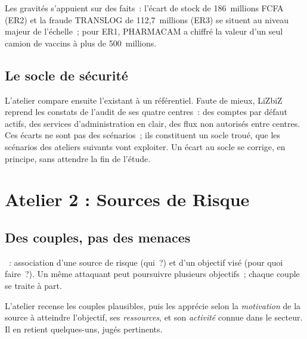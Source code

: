 Les gravités s'appuient sur des faits~: l'écart de stock de 186~millions
FCFA (ER2) et la fraude TRANSLOG de 112,7~millions (ER3) se situent au
niveau majeur de l'échelle~; pour ER1, PHARMACAM a chiffré la valeur d'un
seul camion de vaccins à plus de 500~millions.

\subsection{Le socle de sécurité}

L'atelier compare ensuite l'existant à un référentiel. Faute de mieux,
LiZbiZ reprend les constats de l'audit de ses quatre centres~: des comptes
par défaut actifs, des services d'administration en clair, des flux non
autorisés entre centres. Ces écarts ne sont pas des scénarios~; ils
constituent un socle troué, que les scénarios des ateliers suivants vont
exploiter. Un écart au socle se corrige, en principe, sans attendre la fin
de l'étude.

\section{Atelier 2 : Sources de Risque}
\label{sec:c04-atelier2}

\subsection{Des couples, pas des menaces}

\begin{boxdef}
~: association d'une source de
risque (qui~?) et d'un objectif visé (pour quoi faire~?). Un même
attaquant peut poursuivre plusieurs objectifs~; chaque couple se traite à
part.
\end{boxdef}

L'atelier recense les couples plausibles, puis les apprécie selon la
\emph{motivation} de la source à atteindre l'objectif, ses
\emph{ressources}, et son \emph{activité} connue dans le secteur. Il en
retient quelques-uns, jugés pertinents.


